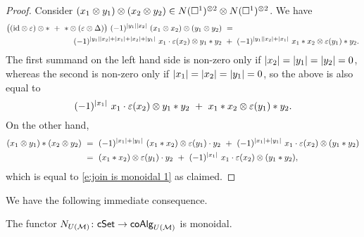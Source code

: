\begin{proof}
	Consider $(x_1 \otimes y_1) \otimes (x_2 \otimes y_2) \in N(\square^1)^{\otimes 2} \otimes N(\square^1)^{\otimes 2}$.
	We have
	\begin{equation*}
	\begin{split}
	\big((\id \otimes \varepsilon) \otimes \ast \ + \ \ast \otimes (\varepsilon \otimes \Delta)\big) \ (-1)^{\bars{y_1} \bars{x_2}} \ (x_1 \otimes x_2) \otimes (y_1 \otimes y_2) \ & = \\
	(-1)^{\bars{y_1} \bars{x_2} + \bars{x_1} + \bars{x_2} + \bars{y_1}} \ x_1 \cdot \varepsilon(x_2) \otimes y_1 \ast y_2 \ & + \ 
	(-1)^{\bars{y_1} \bars{x_2} + \bars{x_1}} \ x_1 \ast x_2 \otimes \varepsilon(y_1) \ast y_2.
	\end{split}
	\end{equation*}
	The first summand on the left hand side is non-zero only if $\vert{x_2}\vert = \vert{y_1}\vert = \vert{y_2}\vert = 0$, whereas the second is non-zero only if $\vert{x_1}\vert = \vert{x_2}\vert = \vert{y_1}\vert = 0$, so the above is also equal to
	\begin{equation} \label{e:join is monoidal 1}
	(-1)^{\bars{x_1}} \ x_1 \cdot \varepsilon(x_2) \otimes y_1 \ast y_2 \ + \ 
	x_1 \ast x_2 \otimes \varepsilon(y_1) \ast y_2.
	\end{equation}
	On the other hand,
	\begin{align*}
	(x_1 \otimes y_1) \ast (x_2 \otimes y_2) \ & =\ 
	(-1)^{\bars{x_1} + \bars{y_1}} \ (x_1 \ast x_2) \otimes \varepsilon(y_1) \cdot y_2 \ +\
	(-1)^{\bars{x_1} + \bars{y_1}} \ x_1 \cdot \varepsilon(x_2) \otimes (y_1 \ast y_2) \\ \ & =\ 
	(x_1 \ast x_2) \otimes \varepsilon(y_1) \cdot y_2 \ +\
	(-1)^{\bars{x_1}} \ x_1 \cdot \varepsilon(x_2) \otimes (y_1 \ast y_2),
	\end{align*}
	which is equal to \eqref{e:join is monoidal 1} as claimed.
\end{proof}

We have the following immediate consequence.

\begin{theorem} \label{t:lift chains on cSet to UM coAlg is monoidal}
    The functor $N_{U(\mathcal{M})} \colon \mathsf{cSet} \to \mathsf{coAlg}_{U(\mathcal{M})}$ is monoidal.
\end{theorem}